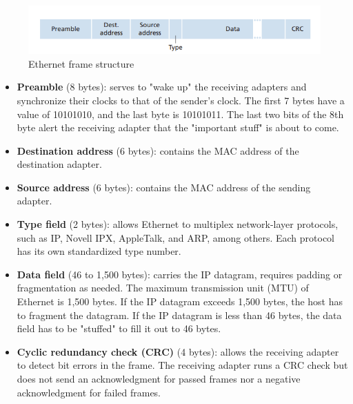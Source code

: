 \begin{figure}[H]
    \centering
    \includegraphics[width = 1\linewidth]{img/5/Ethernet.png}
    \caption{Ethernet frame structure \cite{Kurose2017}}
    \label{fig:ethernet}
\end{figure}

\begin{itemize}
\item \textbf{Preamble} (8 bytes): serves to "wake up" the receiving adapters and synchronize their clocks to that of the sender's clock. The first 7 bytes have a value of 10101010, and the last byte is 10101011. The last two bits of the 8th byte alert the receiving adapter that the "important stuff" is about to come.

\item \textbf{Destination address} (6 bytes): contains the MAC address of the destination adapter.

\item \textbf{Source address} (6 bytes): contains the MAC address of the sending adapter.

\item \textbf{Type field} (2 bytes): allows Ethernet to multiplex network-layer protocols, such as IP, Novell IPX, AppleTalk, and ARP, among others. Each protocol has its own standardized type number.

\item \textbf{Data field} (46 to 1,500 bytes): carries the IP datagram, requires padding or fragmentation as needed. The maximum transmission unit (MTU) of Ethernet is 1,500 bytes. If the IP datagram exceeds 1,500 bytes, the host has to fragment the datagram. If the IP datagram is less than 46 bytes, the data field has to be "stuffed" to fill it out to 46 bytes.

\item \textbf{Cyclic redundancy check (CRC)} (4 bytes): allows the receiving adapter to detect bit errors in the frame. The receiving adapter runs a CRC check but does not send an acknowledgment for passed frames nor a negative acknowledgment for failed frames.
\end{itemize}

